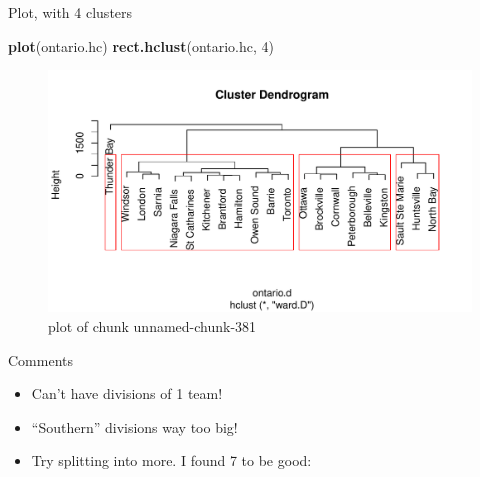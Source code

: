 \documentclass[ignorenonframetext,]{beamer}
\newenvironment{Shaded}{\begin{snugshade}}{\end{snugshade}}
\newcommand{\DecValTok}[1]{\textcolor[rgb]{0.00,0.00,0.81}{#1}}
\newcommand{\KeywordTok}[1]{\textcolor[rgb]{0.13,0.29,0.53}{\textbf{#1}}}
\newcommand{\NormalTok}[1]{#1}
\begin{document}
\begin{frame}[fragile]{Plot, with 4 clusters}
\protect\hypertarget{plot-with-4-clusters}{}

\begin{Shaded}
\begin{Highlighting}[]
\KeywordTok{plot}\NormalTok{(ontario.hc)}
\KeywordTok{rect.hclust}\NormalTok{(ontario.hc, }\DecValTok{4}\NormalTok{)}
\end{Highlighting}
\end{Shaded}

\begin{figure}
\centering
\includegraphics{figure/unnamed-chunk-381-1.pdf}
\caption{plot of chunk unnamed-chunk-381}
\end{figure}

\end{frame}

\begin{frame}{Comments}
\protect\hypertarget{comments-18}{}

\begin{itemize}
\item
  Can't have divisions of 1 team!
\item
  ``Southern'' divisions way too big!
\item
  Try splitting into more. I found 7 to be good:
\end{itemize}

\end{frame}
\end{document}
